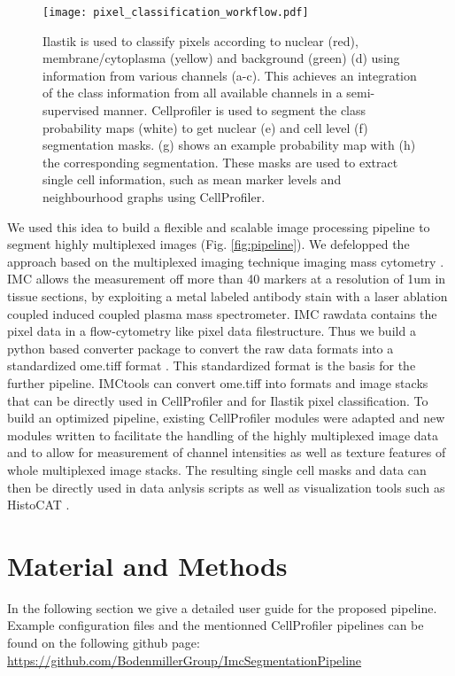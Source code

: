 \documentclass[a4paper]{article}
\begin{document}
\begin{figure}[htb]
\centering
\texttt{[image: pixel\_classification\_workflow.pdf]}
\caption{Ilastik is used to classify pixels according to nuclear
(red), membrane/cytoplasma (yellow) and background (green) (d)
using information from various channels (a-c). This achieves an
integration of the class information from all available channels in a
semi-supervised manner. Cellprofiler is used to segment the class probability maps (white)
to get nuclear (e) and cell level (f) segmentation masks.
	(g) shows an example probability
	map with (h) the corresponding segmentation. These masks are used to extract single cell information, such as mean
marker levels and neighbourhood graphs using CellProfiler.
\label{fig:class}
} 
\end{figure}


We used this idea to build a flexible and scalable image processing pipeline to segment highly
multiplexed images (Fig. \ref{fig:pipeline}). We defelopped the approach  based on the multiplexed imaging technique imaging mass
cytometry \cite{giesen_highly_2014}. IMC allows the measurement off more
than 40 markers at a resolution of 1um in tissue sections, by exploiting a metal labeled antibody
stain with a laser ablation coupled induced coupled plasma mass spectrometer. IMC rawdata contains
the pixel data in a flow-cytometry like pixel data filestructure. Thus we build a python based
converter package to convert the raw data formats into a standardized ome.tiff format
\cite{goldberg_open_2005}. This standardized format is the basis for the further pipeline. IMCtools
can convert ome.tiff into formats and image stacks that can be directly used in CellProfiler and for Ilastik pixel classification.
To build an optimized pipeline, existing CellProfiler modules were adapted and new modules written to facilitate the handling of the
highly multiplexed image data and to allow for measurement of channel intensities as well as texture features of
whole multiplexed image stacks. The resulting single cell masks and data can then be directly used in data
anlysis scripts as well as visualization tools such as HistoCAT \cite{schapiro_histocat:_2017}. 

\newpage
\section{Material and Methods}
In the following section we give a detailed user guide for the proposed pipeline. Example
configuration files and the mentionned CellProfiler pipelines can be found on the following github page: \url{https://github.com/BodenmillerGroup/ImcSegmentationPipeline}
\end{document}
